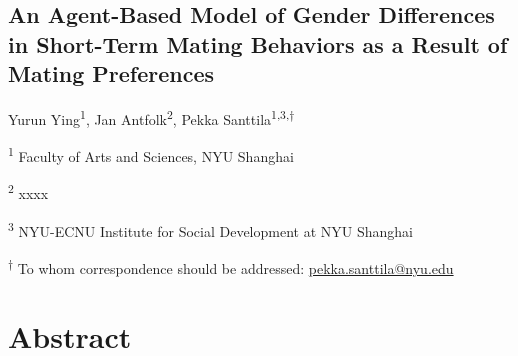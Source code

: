 \documentclass[
  11pt,
]{article}
\author{}
\date{\vspace{-2.5em}}
\begin{document}
\begin{titlepage}

\begin{center}

\vspace*{30mm}

\hypertarget{an-agent-based-model-of-gender-differences-in-short-term-mating-behaviors-as-a-result-of-mating-preferences}{%
\section*{An Agent-Based Model of Gender Differences in Short-Term
Mating Behaviors as a Result of Mating
Preferences}\label{an-agent-based-model-of-gender-differences-in-short-term-mating-behaviors-as-a-result-of-mating-preferences}}

\vspace{30mm}

Yurun Ying\textsuperscript{1}, Jan Antfolk\textsuperscript{2}, Pekka
Santtila\textsuperscript{1,3,\(\dagger\)}

\textsuperscript{1} Faculty of Arts and Sciences, NYU Shanghai

\textsuperscript{2} xxxx

\textsuperscript{3} NYU-ECNU Institute for Social Development at NYU
Shanghai

\end{center}

\vspace{40mm}

\textsuperscript{\(\dagger\)} To whom correspondence should be
addressed: \url{pekka.santtila@nyu.edu}

\end{titlepage}

\newpage

\hypertarget{abstract}{%
\section*{Abstract}\label{abstract}}
\end{document}
